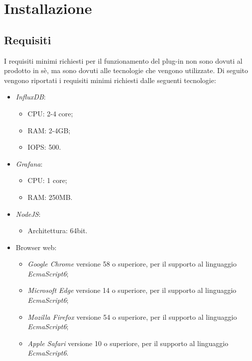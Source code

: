 \section{Installazione}\label{Installazione}

\subsection{Requisiti}\label{Requisiti}
I requisiti minimi richiesti per il funzionamento del plug-in non sono dovuti al prodotto in sè, ma sono dovuti alle tecnologie che vengono utilizzate. Di seguito vengono riportati i requisiti minimi richiesti dalle seguenti tecnologie:
\begin{itemize}
	\item \textit{InfluxDB}:
	\begin{itemize}
		\item CPU: 2-4 core;
		\item RAM: 2-4GB;
		\item IOPS: 500.
	\end{itemize}
	\item \textit{Grafana}:
	\begin{itemize}
		\item CPU: 1 core;
		\item RAM: 250MB.
	\end{itemize}
	\item \textit{NodeJS}:
	\begin{itemize}
		\item Architettura: 64bit.
	\end{itemize}
	\item Browser web:
	\begin{itemize}
		\item \textit{Google Chrome} versione 58 o superiore, per il supporto al linguaggio \textit{EcmaScript6};
		\item \textit{Microsoft Edge} versione 14 o superiore, per il supporto al linguaggio \textit{EcmaScript6};
		\item \textit{Mozilla Firefox} versione 54 o superiore, per il supporto al linguaggio \textit{EcmaScript6};
		\item \textit{Apple Safari} versione 10 o superiore, per il supporto al linguaggio \textit{EcmaScript6}.
	\end{itemize}
\end{itemize}
\pagebreak

